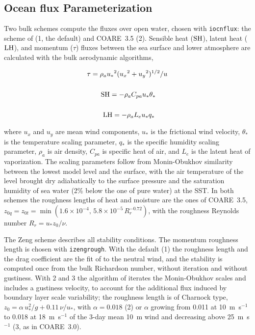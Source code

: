 {\subsection{Ocean flux Parameterization}

Two bulk schemes compute the fluxes over open water, chosen with
\texttt{iocnflux}: the scheme of \cite{Zeng_98} (1, the default) and
COARE~3.5 (2). Sensible heat (${\rm SH}$), latent heat (${\rm LH}$), and
momentum ($\tau$) fluxes between the sea surface and lower atmosphere are
calculated with the bulk aerodynamic algorithms,

\begin{eqnarray}
\tau = \rho_a {u_{\ast}}^2 ({u_{x}}^2 + {u_{y}}^2)^{1/2} / u \\ \nonumber \\
{\rm SH} = -\rho_a C_{pa} u_{\ast} \theta_{\ast} \hspace{.6cm} \\ \nonumber \\
{\rm LH} =  -\rho_a L_{e} u_{\ast} q_{\ast}  \hspace{.65cm}
\end{eqnarray}

where $u_x$ and $u_y$ are mean wind components, $u_{\ast}$ is the
frictional wind velocity, $\theta_{\ast}$ is the temperature scaling parameter,
$q_{\ast}$ is the specific humidity scaling parameter,  $\rho_a$ is air density,
$C_{pa}$ is specific heat of air, and $L_{e}$ is the latent heat of
vaporization. The scaling parameters follow from Monin-Obukhov similarity
between the lowest model level and the surface, with the air temperature
of the level brought dry adiabatically to the surface pressure and the
saturation humidity of sea water (2\% below the one of pure water) at the
SST. In both schemes the roughness lengths of heat and moisture are the
ones of COARE~3.5,
$z_{0q} = z_{0t} = \min(1.6\times10^{-4},\,5.8\times10^{-5}\,R_r^{-0.72})$,
with the roughness Reynolds number $R_r = u_\ast z_0/\nu$.

The Zeng scheme describes all stability conditions. The momentum roughness
length is chosen with \texttt{izengrough}. With the default (1) the
roughness length and the drag coefficient are the fit of
\cite{Hersbach_10} to the neutral wind, and the stability is computed once
from the bulk Richardson number, without iteration and without gustiness.
With 2 and 3 the algorithm of \cite{Zeng_98} iterates the Monin-Obukhov
scales and includes a gustiness velocity, to account for the additional
flux induced by boundary layer scale variability; the roughness length is
of Charnock type, $z_0 = \alpha\,u_\ast^2/g + 0.11\,\nu/u_\ast$, with
$\alpha = 0.018$ (2) or $\alpha$ growing from 0.011 at 10~m~s$^{-1}$ to
0.018 at 18~m~s$^{-1}$ of the 3-day mean 10~m wind and decreasing above
25~m~s$^{-1}$ (3, as in COARE~3.0).

}
